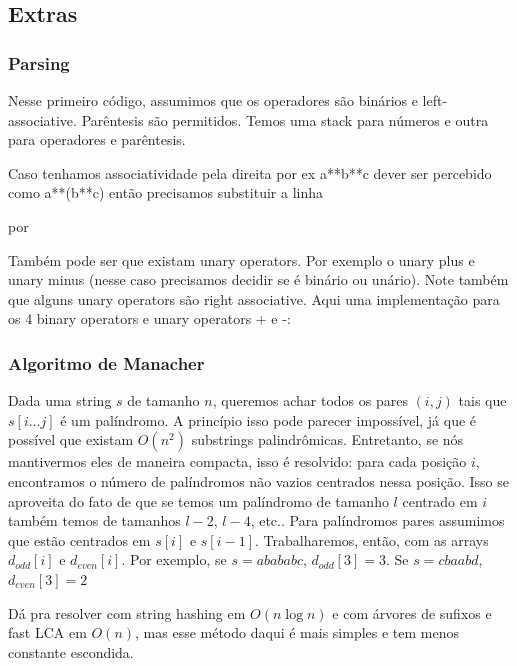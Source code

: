 \subsection{Extras}

\subsubsection{Parsing}

Nesse primeiro código, assumimos que os operadores são binários e left-associative. Parêntesis são permitidos. Temos uma stack para números e outra para operadores e parêntesis.


Caso tenhamos associatividade pela direita por ex a**b**c dever ser percebido como a**(b**c) então precisamos substituir a linha


por


Também pode ser que existam unary operators. Por exemplo o unary plus e unary minus (nesse caso precisamos decidir se é binário ou unário). Note também que alguns unary operators são right associative. Aqui uma implementação para os 4 binary operators e unary operators + e -:


\subsubsection{Algoritmo de Manacher}

Dada uma string $s$ de tamanho $n$, queremos achar todos os pares $(i, j)$ tais que $s[i \dots j]$ é um palíndromo. A princípio isso pode parecer impossível, já que é possível que existam $O(n^2)$ substrings palindrômicas. Entretanto, se nós mantivermos eles de maneira compacta, isso é resolvido: para cada posição $i$, encontramos o número de palíndromos não vazios centrados nessa posição. Isso se aproveita do fato de que se temos um palíndromo de tamanho $l$ centrado em $i$ também temos de tamanhos $l-2$, $l-4$, etc.. Para palíndromos pares assumimos que estão centrados em $s[i]$ e $s[i-1]$. Trabalharemos, então, com as arrays $d_{odd}[i]$ e $d_{even}[i]$. Por exemplo, se $s=abababc$, $d_{odd}[3] = 3$. Se $s = cbaabd$, $d_{even}[3] = 2$

Dá pra resolver com string hashing em $O(n \log n)$ e com árvores de sufixos e fast LCA em $O(n)$, mas esse método daqui é mais simples e tem menos constante escondida.

